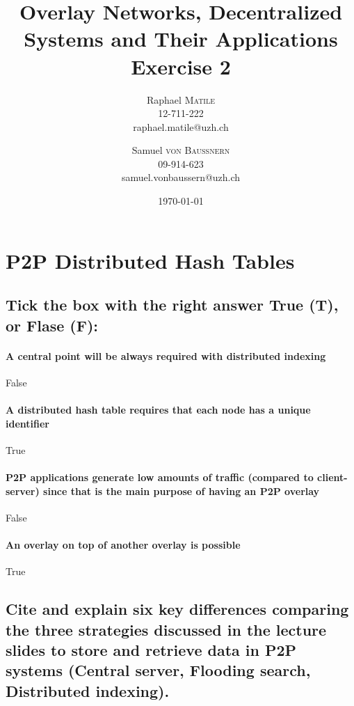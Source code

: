 \documentclass{article}
\title{Overlay Networks, Decentralized Systems and Their Applications
\\Exercise 2}
\author{Raphael \textsc{Matile}\\12-711-222\\raphael.matile@uzh.ch
\and Samuel \textsc{von Baussnern}\\09-914-623\\samuel.vonbaussern@uzh.ch}
\date{\today} %
\begin{document}
\maketitle %

\section{P2P Distributed Hash Tables}

\subsection{Tick the box with the right answer True (T), or Flase (F):}

  \paragraph{A central point will be always required with distributed indexing}

    False

  \paragraph{A distributed hash table requires that each node has a unique identifier}

    True

  \paragraph{P2P applications generate low amounts of traffic (compared to client-server)
         since that is the main purpose of having an P2P overlay}

    False

  \paragraph{An overlay on top of another overlay is possible}

    True


\subsection{Cite and explain six key differences comparing the three strategies
discussed in the lecture slides to store and retrieve data in P2P systems
(Central server, Flooding search, Distributed indexing).}
\end{document}
